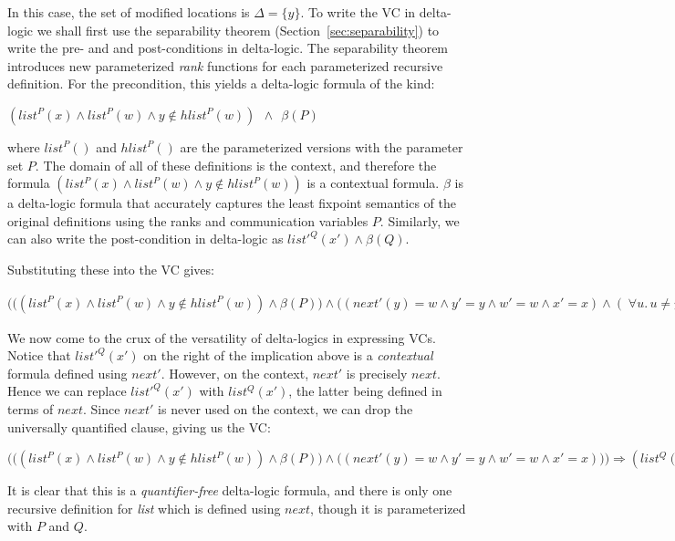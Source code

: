 In this case, the set of modified locations is $\Delta{} = \{y\}$. To write the VC in delta-logic we shall first use the separability theorem (Section~\ref{sec:separability}) to write the pre- and and post-conditions in delta-logic. The separability theorem introduces new parameterized \emph{rank} functions for each parameterized recursive definition. For the precondition, this yields a delta-logic formula of the kind:
\begin{center}
 $\left(list^{P}(x) \wedge  list^{P}(w) \wedge  y \not \in hlist^{P}(w)\right) ~~\land{}~~ \beta{}(P)$
\end{center}
where $list^{P}()$ and $hlist^{P}()$ are the parameterized versions with the parameter set $P$. The domain of all of these definitions is the context, and therefore the formula $\left(list^{P}(x) \wedge  list^{P}(w) \wedge  y \not \in hlist^{P}(w)\right)$ is a contextual formula. $\beta{}$ is a delta-logic formula that accurately captures the least fixpoint semantics of the original definitions using the ranks and communication variables $P$. Similarly, we can also write the post-condition in delta-logic as $list'^{Q}(x') \land{} \beta{}(Q)$.

Substituting these into the VC gives:

\begin{center}
$\Big( \big( \left(list^{P}(x) \wedge  list^{P}(w) \wedge  y \not \in hlist^{P}(w) \right) \land{} \beta{}(P) \big) \land{} \big( \left(next'(y) = w \land{} y' = y \land{} w' = w \land{} x' = x\right) \land{} \left(\; \forall{}u.\, u\neq{}y \Rightarrow{} next'(u) = next(u)\; \right) \big) \Big) \Rightarrow{} \left(list'^{Q}(x') \land{} \beta{}(Q) \right)$
\end{center}

We now come to the crux of the versatility of delta-logics in expressing VCs. 
Notice that $list'^Q(x')$ on the
right of the implication above is a \emph{contextual} formula defined using $next'$. However, on the context, $next'$ is precisely $next$. Hence we can replace $list'^Q(x')$ with $list^Q(x')$, the latter being defined in terms of $next$. Since $next'$ is never used on the context, we can drop the universally quantified clause, giving us the VC:

\begin{center}
$\Big( \big( \left(list^{P}(x) \wedge  list^{P}(w) \wedge  y \not \in hlist^{P}(w) \right) \land{} \beta{}(P) \big) \land{} \big( \left(next'(y) = w \land{} y' = y \land{} w' = w \land{} x' = x\right) \big) \Big) \Rightarrow{} \left(list^{Q}(x') \land{} \beta{}(Q) \right)$
\end{center}
It is clear that this is a \emph{quantifier-free} delta-logic formula, and there is only one recursive definition for \emph{list} which is defined using $next$, though it is parameterized with $P$ and $Q$.
\medskip

